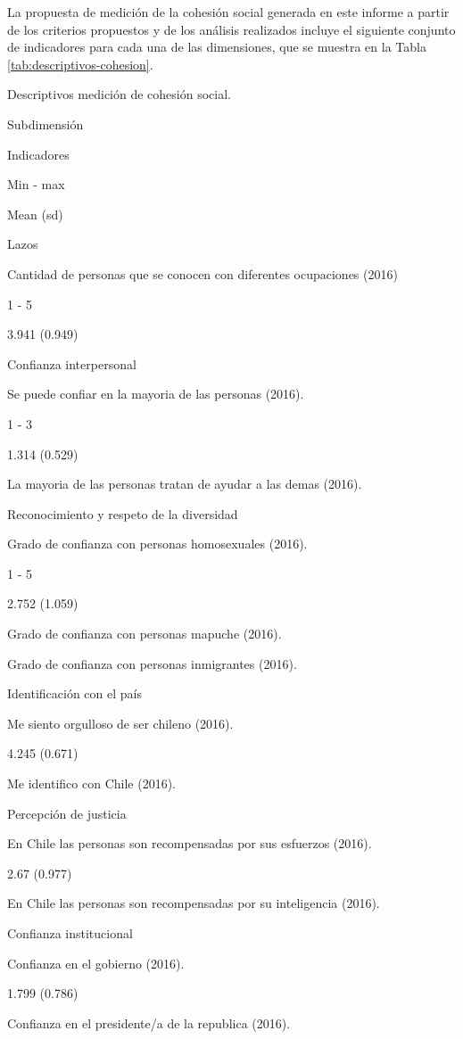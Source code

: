 \documentclass[
  12pt,
]{book}
\begin{document}
La propuesta de medición de la cohesión social generada en este informe a partir de los criterios propuestos y de los análisis realizados incluye el siguiente conjunto de indicadores para cada una de las dimensiones, que se muestra en la Tabla \ref{tab:descriptivos-cohesion}.

\label{tab:descriptivos-cohesion}Descriptivos medición de cohesión social.

Subdimensión

Indicadores

Min - max

Mean (sd)

Lazos

Cantidad de personas que se conocen con diferentes ocupaciones (2016)

1 - 5

3.941 (0.949)

Confianza interpersonal

Se puede confiar en la mayoria de las personas (2016).

1 - 3

1.314 (0.529)

La mayoria de las personas tratan de ayudar a las demas (2016).

Reconocimiento y respeto de la diversidad

Grado de confianza con personas homosexuales (2016).

1 - 5

2.752 (1.059)

Grado de confianza con personas mapuche (2016).

Grado de confianza con personas inmigrantes (2016).

Identificación con el país

Me siento orgulloso de ser chileno (2016).

4.245 (0.671)

Me identifico con Chile (2016).

Percepción de justicia

En Chile las personas son recompensadas por sus esfuerzos (2016).

2.67 (0.977)

En Chile las personas son recompensadas por su inteligencia (2016).

Confianza institucional

Confianza en el gobierno (2016).

1.799 (0.786)

Confianza en el presidente/a de la republica (2016).
\end{document}
